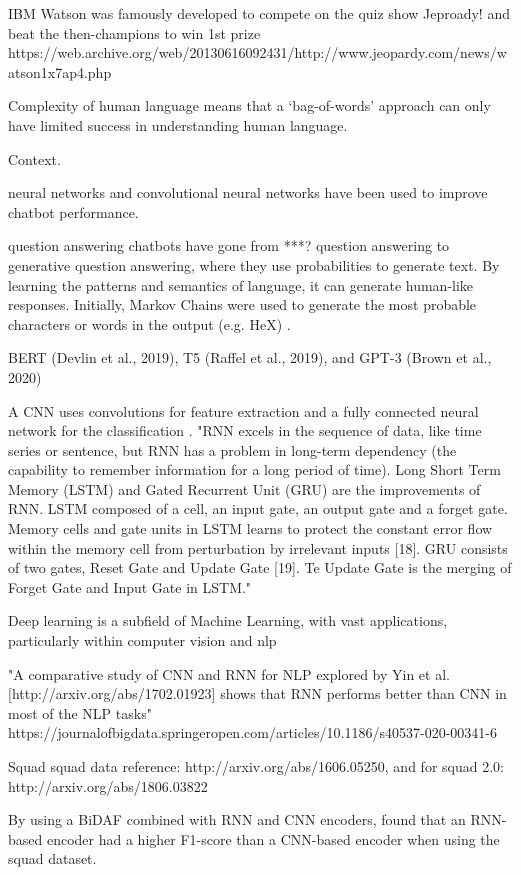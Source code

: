 IBM Watson was famously developed to compete on the quiz show Jeproady! and beat the then-champions to win 1st prize https://web.archive.org/web/20130616092431/http://www.jeopardy.com/news/watson1x7ap4.php


 

Complexity of human language means that a `bag-of-words' approach can only have limited success in understanding human language.

Context.

neural networks and convolutional neural networks have been used to improve chatbot performance.

question answering chatbots have gone from ***? question answering to generative question answering, where they use probabilities to generate text. By learning the patterns and semantics of language, it can generate human-like responses. Initially, Markov Chains were used to generate the most probable characters or words in the output (e.g. HeX) \citep{Luka, Ahmad}. 

BERT (Devlin et al., 2019), T5 (Raffel et al., 2019), and GPT-3 (Brown et al., 2020)

A CNN uses convolutions for feature extraction and a fully connected neural network for the classification \citep{Budiharto}. "RNN excels in the sequence of data, like time series or sentence, but RNN has a problem in long-term dependency (the capability to remember information for a long period of time). Long Short Term Memory (LSTM) and Gated Recurrent Unit (GRU) are the improvements of RNN. LSTM composed of a cell, an input gate, an output gate and a forget gate. Memory cells and gate units in LSTM learns to protect the constant error flow within the memory cell from perturbation by irrelevant inputs [18]. GRU consists of two gates, Reset Gate and Update Gate [19]. Te Update Gate is the merging of Forget Gate and Input Gate in LSTM."

Deep learning is a subfield of Machine Learning, with vast applications, particularly within computer vision and \acrshort{nlp}

"A comparative study of CNN and RNN for NLP explored by Yin et  al. [http://arxiv.org/abs/1702.01923] shows that RNN performs better than CNN in most of the NLP tasks" https://journalofbigdata.springeropen.com/articles/10.1186/s40537-020-00341-6


Squad \acrshort{squad} data reference: http://arxiv.org/abs/1606.05250, and for squad 2.0: http://arxiv.org/abs/1806.03822

By using a BiDAF combined with RNN and CNN encoders, \citep{Budiharto} found that an RNN-based encoder had a higher F1-score than a CNN-based encoder when using the \acrshort{squad} dataset.

